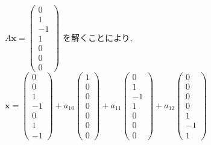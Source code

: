 \documentclass{jsarticle}
\begin{document}
$A\bm{x} = \begin{pmatrix} 0 \\ 1 \\ -1 \\ 1 \\ 0 \\ 0 \\ 0 \end{pmatrix}$ を解くことにより, 
$\bm{x} = \begin{pmatrix} 0 \\ 0 \\ 1 \\ -1 \\ 0 \\ 1 \\ -1 \end{pmatrix} + a_{10} \begin{pmatrix} 1 \\ 0 \\ 0 \\ 0 \\ 0 \\ 0 \\ 0 \end{pmatrix} + a_{11} \begin{pmatrix} 0 \\ 1 \\ -1 \\ 1 \\ 0 \\ 0 \\ 0 \end{pmatrix} + a_{12} \begin{pmatrix} 0 \\ 0 \\ 0 \\ 0 \\ 1 \\ -1 \\ 1 \end{pmatrix}$
\end{document}
